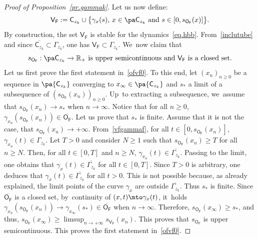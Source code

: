 \begin{proof}[Proof of Proposition~\ref{pr.gammak}]
Let us now define:
\begin{equation}\label{VF}
\mathsf V_{\mathsf F}:= \mathsf C_{z_k} \cup \big \{ \gamma_x(s), \, x\in \pa \mathsf C_{z_k} \text{ and } s\in [0,s_{\mathsf O_{\mathsf F}}(x)]\big \}.
\end{equation}
By construction, the set $\mathsf V_{\mathsf F}$
is stable for the dynamics~\eqref{eq.hbb}. From~\eqref{inclutube} and since $\overline{\mathsf C_{z_k}}\subset \Gamma_{z_k}$, one has $\mathsf V_{\mathsf F}\subset \Gamma_{z_k}$. We~now claim that
\begin{equation}\label{ofvf0}
s_{\mathsf O_{\mathsf F}}: \pa \mathsf C_{z_k}\to \mathbb R_+ \text{ is upper semicontinuous and }
{ \mathsf V_{\mathsf F}}\text{ is a closed set}.
\end{equation}
Let us first prove the first statement in~\eqref{ofvf0}.
To this end, let $(x_n)_{n\ge 0}$ be a sequence in $ \pa { \mathsf C_{z_k}}$ converging to $x_{\infty}\in \pa { \mathsf C_{z_k}}$ and $s_*$ a limit of a subsequence of $(s_{\mathsf O_{\mathsf F}}(x_n))_{n\ge 0}$.
Up~to extracting a subsequence, we~assume that $s_{\mathsf O_{\mathsf F}}(x_n)\to s_*$ when $n\to \infty$.
Notice that for all $n\ge 0$,
$\gamma_{x_n}(s_{\mathsf O_{\mathsf F}}(x_n))\in \overline{\mathsf O_{\mathsf F}}$.
Let us prove that $s_*$ is finite. Assume that it is not the case, \ie that $s_{\mathsf O_{\mathsf F}}(x_n)\to +\infty$. From~\eqref{vfgammaf}, for all $t\in [0,s_{\mathsf O_{\mathsf F}}(x_n)]$, $\gamma_{x_n}(t)\in \Gamma_{z_k}$. Let $T>0$ and consider $N\ge 1$ such that $s_{\mathsf O_{\mathsf F}}(x_n)\ge T$ for all $n\ge N$. Then, for all $t\in [0,T]$ and $n\ge N$, $\gamma_{x_n}(t)\in \overline{\Gamma_{z_k}}$. Passing to the limit, one obtains that
$\gamma_{x}(t)\in \overline{\Gamma_{z_k}}$ for all $t\in [0,T]$. Since $T>0$ is arbitrary, one deduces that $\gamma_{x}(t)\in \overline{\Gamma_{z_k}}$ for all $t>0$. This is not possible because, as already explained, the limit points of the curve $\gamma_{x}$ are outside $ \overline{\Gamma_{z_k}}$. Thus $s_*$ is finite.
Since
$\overline{\mathsf O_{\mathsf F}}$ is a closed set, by~continuity of $(x,t)\mto \gamma_x(t)$, it~holds $\gamma_{x_n}(s_{\mathsf O_{\mathsf F}}(x_n))\to \gamma_{x_{\infty}}(s_*)\in \overline{\mathsf O_{\mathsf F}}$ when $n\to \infty$. Therefore, $s_{\mathsf O_{\mathsf F}}(x_{\infty})\ge s_*$, and thus, $s_{\mathsf O_{\mathsf F}}(x_{\infty})\ge \limsup_{n\to +\infty }s_{\mathsf V_{\mathsf F}}(x_n)$.
This proves that $s_{\mathsf O_{\mathsf F}}$ is upper
semicontinuous. This proves the first statement in~\eqref{ofvf0}.


\end{proof}
